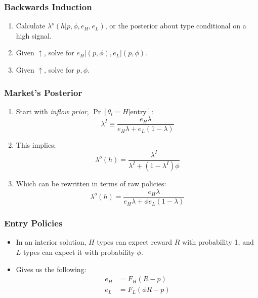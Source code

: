 \documentclass{beamer}
\begin{document}
\begin{frame}
    \frametitle{Backwards Induction}
    \begin{enumerate}[<+>]
        \item Calculate $\lambda^o(h|p, \phi, e_H, e_L)$, or the posterior about type conditional on a high signal.
        \item Given $\uparrow$, solve for $e_H|(p, \phi), e_L|(p, \phi)$. 
        \item Given $\uparrow$, solve for $p, \phi$.
    \end{enumerate}
\end{frame}

\begin{frame}
    \frametitle{Market's Posterior}
    \begin{enumerate}[<+>]
        \item Start with \emph{inflow prior}, $\Pr[\theta_i = H | \text{entry}]$:
        \begin{equation}
            \label{inflow-prior}
            \lambda^I \equiv \frac{e_H \lambda}{e_H \lambda + e_L (1 - \lambda)}
        \end{equation}
        \item This implies; 
        \begin{equation}
            \lambda^o(h) = \frac{\lambda^I}{\lambda^I + (1 - \lambda^I)\phi}
        \end{equation} 
        \item Which can be rewritten in terms of raw policies: 
        \begin{equation}
            \label{lambda-o-final}
            \lambda^o(h) = \frac{e_H \lambda}{e_H \lambda + \phi e_L (1 - \lambda)}
        \end{equation}
    \end{enumerate}
\end{frame}

\begin{frame}
    \frametitle{Entry Policies}
    \begin{itemize}[<+>]
        \item In an interior solution, $H$ types can expect reward $R$ with probability 1, and $L$ types can expect it with probability $\phi$. 
        \item Gives us the following: 
        \begin{align}
            e_H &= F_H(R - p) \label{high-entry} \\ 
            e_L &= F_L(\phi R - p) \label{low-entry}
        \end{align}
    \end{itemize}
\end{frame}
\end{document}
